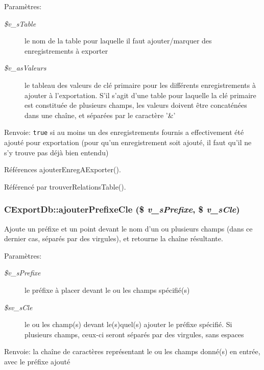 \begin{Desc}
\item[Paramètres:]
\begin{description}
\item[{\em \$v\_\-sTable}]le nom de la table pour laquelle il faut ajouter/marquer des enregistrements à exporter \item[{\em \$v\_\-asValeurs}]le tableau des valeurs de clé primaire pour les différents enregistrements à ajouter à l'exportation. S'il s'agit d'une table pour laquelle la clé primaire est constituée de plusieurs champs, les valeurs doivent être concaténées dans une chaîne, et séparées par le caractère '\&'\end{description}
\end{Desc}
\begin{Desc}
\item[Renvoie:]{\tt true} si au moins un des enregistrements fournis a effectivement été ajouté pour exportation (pour qu'un enregistrement soit ajouté, il faut qu'il ne s'y trouve pas déjà bien entendu) \end{Desc}


Références ajouterEnregAExporter().

Référencé par trouverRelationsTable().
\subsubsection{\setlength{\rightskip}{0pt plus 5cm}CExportDb::ajouterPrefixeCle (\$ {\em v\_\-sPrefixe}, \/  \$ {\em v\_\-sCle})}\label{class_c_export_db_9f8651031fd5da8d780a37733d4a7e99}


Ajoute un préfixe et un point devant le nom d'un ou plusieurs champs (dans ce dernier cas, séparés par des virgules), et retourne la chaîne résultante. 

\begin{Desc}
\item[Paramètres:]
\begin{description}
\item[{\em \$v\_\-sPrefixe}]le préfixe à placer devant le ou les champs spécifié(s) \item[{\em \$sv\_\-sCle}]le ou les champ(s) devant le(s)quel(s) ajouter le préfixe spécifié. Si plusieurs champs, ceux-ci seront séparés par des virgules, sans espaces\end{description}
\end{Desc}
\begin{Desc}
\item[Renvoie:]la chaîne de caractères représentant le ou les champs donné(s) en entrée, avec le préfixe ajouté \end{Desc}


